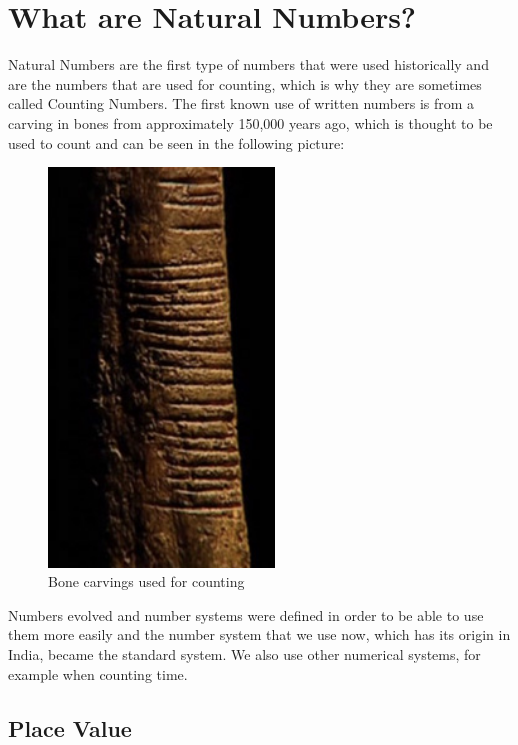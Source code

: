 \documentclass[11pt, oneside]{article}
\theoremstyle{definition}
\begin{document}
\section{What are Natural Numbers?}

Natural Numbers are the first type of numbers that were used historically and are the numbers that are used for counting, which is why they are sometimes called Counting Numbers. The first known use of written numbers is from a carving in bones from approximately 150,000 years ago, which is thought to be used to count and can be seen in the following picture:

\begin{figure}[ht!]
\centering
\includegraphics[width=60mm]{bone-carving.jpg}
\caption{Bone carvings used for counting \label{overflow}}
\end{figure}

Numbers evolved and number systems were defined in order to be able to use them more easily and the number system that we use now, which has its origin in India, became the standard system. We also use other numerical systems, for example when counting time. 

\subsection{Place Value}
\end{document}
